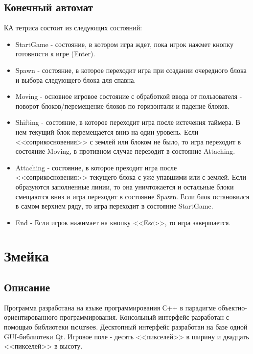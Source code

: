 \documentclass{article}
\begin{document}
\subsection{Конечный автомат}
КА тетриса состоит из следующих состояний:
\begin{itemize}
    \item StartGame - состояние, в котором игра ждет, пока игрок нажмет кнопку готовности к игре (Enter).
    \item Spawn - состояние, в которое переходит игра при создании очередного блока и выбора следующего блока для спавна.
    \item Moving - основное игровое состояние с обработкой ввода от пользователя - поворот блоков/перемещение блоков по горизонтали и падение блоков.
    \item Shifting - состояние, в которое переходит игра после истечения таймера.
          В нем текущий блок перемещается вниз на один уровень.
          Если <<соприкосновения>> с землей или блоком не было, то игра переходит в состояние Moving, в противном случае перезодит в состояние Attaching.
    \item Attaching - состояние, в которое преходит игра после <<соприкосновения>> текущего блока с уже упавшими или с землей.
          Если образуются заполненные линии, то она уничтожается и остальные блоки смещаются вниз и игра переходит в состояние Spawn.
          Если блок остановился в самом верхнем ряду, то игра переходит в состояние StartGame.
    \item End - Если игрок нажимает на кнопку <<Esc>>, то игра завершается.
\end{itemize}


\section{Змейка}
\subsection{Описание}
\small Программа разработана на языке программирования С++ в парадигме объектно-ориентированного программирования.
Консольный интерфейс разработан с помощью библиотеки \textbf{ncurses}.
Десктопный интерфейс разработан на базе одной GUI-библиотеки Qt.
Игровое поле - десять <<пикселей>> в ширину и двадцать <<пикселей>> в высоту.
\end{document}
